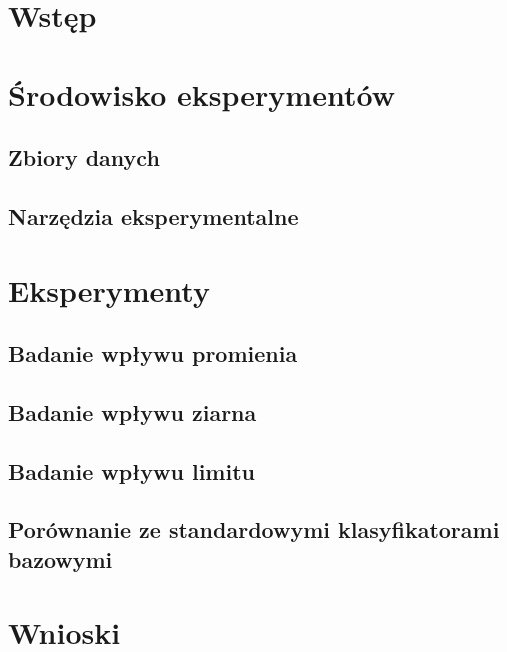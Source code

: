 \documentclass[]{article}
\begin{document}



\newpage

\section{Wstęp}


\section{Środowisko eksperymentów}
	\subsection{Zbiory danych}
	
	
	\subsection{Narzędzia eksperymentalne}
	

\section{Eksperymenty}

	\newpage
	\subsection{Badanie wpływu promienia}
	
	
	\newpage
	\subsection{Badanie wpływu ziarna}
	
	
	\newpage
	\subsection{Badanie wpływu limitu}
	
	
	\newpage
	\subsection{Porównanie ze standardowymi klasyfikatorami bazowymi}
	

\section{Wnioski}




\end{document}
